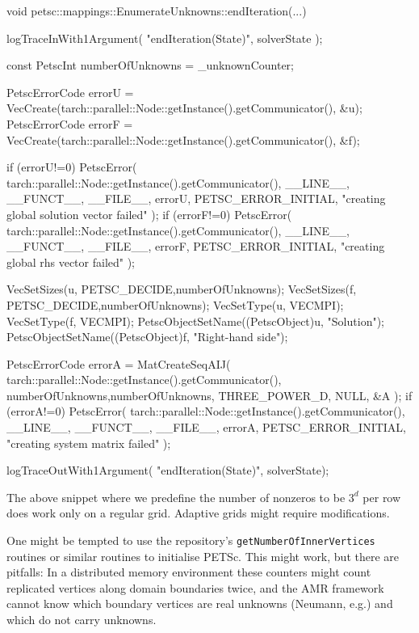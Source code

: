 \begin{code}
void petsc::mappings::EnumerateUnknowns::endIteration(...) {
  logTraceInWith1Argument( "endIteration(State)", solverState );

  const PetscInt numberOfUnknowns = _unknownCounter;

  PetscErrorCode errorU = VecCreate(tarch::parallel::Node::getInstance().getCommunicator(), &u);
  PetscErrorCode errorF = VecCreate(tarch::parallel::Node::getInstance().getCommunicator(), &f);

  if (errorU!=0) {
    PetscError( tarch::parallel::Node::getInstance().getCommunicator(),
      __LINE__,  __FUNCT__,  __FILE__, errorU,  PETSC_ERROR_INITIAL,
      "creating global solution vector failed" );
  }
  if (errorF!=0) {
    PetscError( tarch::parallel::Node::getInstance().getCommunicator(),
      __LINE__,  __FUNCT__,  __FILE__, errorF,  PETSC_ERROR_INITIAL,
      "creating global rhs vector failed" );
  }

  VecSetSizes(u, PETSC_DECIDE,numberOfUnknowns);
  VecSetSizes(f, PETSC_DECIDE,numberOfUnknowns);
  VecSetType(u, VECMPI);
  VecSetType(f, VECMPI);
  PetscObjectSetName((PetscObject)u, "Solution");
  PetscObjectSetName((PetscObject)f, "Right-hand side");

  PetscErrorCode errorA = MatCreateSeqAIJ(
    tarch::parallel::Node::getInstance().getCommunicator(),
    numberOfUnknowns,numberOfUnknowns,
    THREE_POWER_D, NULL,
    &A
  );
  if (errorA!=0) {
    PetscError( tarch::parallel::Node::getInstance().getCommunicator(),
      __LINE__,  __FUNCT__,  __FILE__, errorA,  PETSC_ERROR_INITIAL,
      "creating system matrix failed" );
  }

  logTraceOutWith1Argument( "endIteration(State)", solverState);
}
\end{code}


\begin{remark}
 The above snippet where we predefine the number of nonzeros to be $3^d$ per
 row does work only on a regular grid. Adaptive grids might require
 modifications.
\end{remark}


\begin{remark}
 One might be tempted to use the repository's \texttt{getNumberOfInnerVertices}
 routines or similar routines to initialise PETSc.
 This might work, but there are pitfalls: In a distributed memory environment
 these counters might count replicated vertices along domain boundaries twice,
 and the AMR framework cannot know which boundary vertices are real unknowns
 (Neumann, e.g.) and which do not carry unknowns.
\end{remark}



